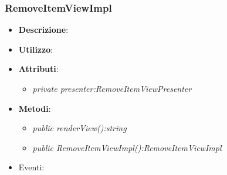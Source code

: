 \subsubsection{RemoveItemViewImpl}
\begin{itemize}
\item \textbf{Descrizione}: 
\item \textbf{Utilizzo}:
\item \textbf{Attributi}: 
	\begin{itemize}
	\item \textit{private presenter:RemoveItemViewPresenter}\\
	
	\end{itemize}
\item \textbf{Metodi}:
	\begin{itemize}
	\item \textit{public renderView():string}\\
	
	\item \textit{public RemoveItemViewImpl():RemoveItemViewImpl}\\
	
	\end{itemize}
\item{Eventi}:
\end{itemize}

